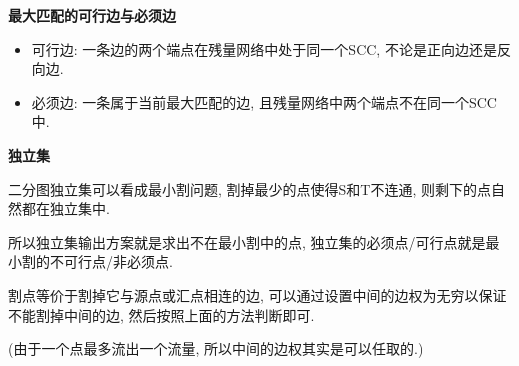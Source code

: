 \textbf{最大匹配的可行边与必须边}

\begin{itemize}
	\item 可行边: 一条边的两个端点在残量网络中处于同一个SCC, 不论是正向边还是反向边.

	\item 必须边: 一条属于当前最大匹配的边, 且残量网络中两个端点不在同一个SCC中.
\end{itemize}

\textbf{独立集}

二分图独立集可以看成最小割问题, 割掉最少的点使得S和T不连通, 则剩下的点自然都在独立集中.

所以独立集输出方案就是求出不在最小割中的点, 独立集的必须点/可行点就是最小割的不可行点/非必须点.

割点等价于割掉它与源点或汇点相连的边, 可以通过设置中间的边权为无穷以保证不能割掉中间的边, 然后按照上面的方法判断即可.

(由于一个点最多流出一个流量, 所以中间的边权其实是可以任取的.)